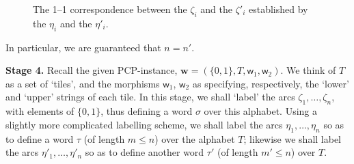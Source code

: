 \documentclass{article}
\newcommand{\fw}{\mathsf{w}}
\newcommand{\fW}{\mathbf{w}}
\newcommand{\set}[1]{\{#1\}}
\begin{document}
\begin{figure}
\caption{The 1--1 correspondence between the $\zeta_i$ and the
  $\zeta'_i$ established by the $\eta_i$ and the $\eta'_i$.}
\label{fig:arcCorrespondence}
\end{figure}
In particular, we are guaranteed that $n = n'$.

\bigskip

\noindent
\textbf{Stage 4.}  Recall the given PCP-instance, $\fW = (\set{0,1},
T, \fw_1, \fw_2)$.  We think of $T$ as a set of `tiles', and the
morphisms $\fw_1$, $\fw_2$ as specifying, respectively, the `lower'
and `upper' strings of each tile.  In this stage, we shall `label' the arcs
$\zeta_1, \ldots, \zeta_n$, with elements of $\set{0,1}$, thus
defining a word $\sigma$ over this alphabet. Using a slightly more
complicated labelling scheme, we shall label the arcs $\eta_1, \ldots,
\eta_n$ so as to define a word $\tau$ (of length $m \leq n$) over the
alphabet $T$; likewise we shall label the arcs $\eta'_1, \ldots, \eta'_n$
so as to define another word $\tau'$ (of length $m' \leq n$) over $T$.
\end{document}
